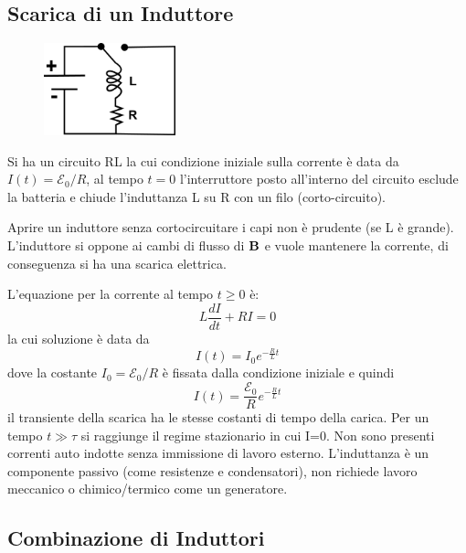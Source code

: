 \subsection{Scarica di un Induttore}

	\begin{figure} %
    \centering
    \includegraphics[width=0.34\textwidth]{images/inductance_discharge} %
\end{figure}
Si ha un circuito RL la cui condizione iniziale sulla corrente \`e data da $I(t) = \mathcal{E}_0/R$, al tempo $t = 0$ l'interruttore posto all'interno del circuito esclude la batteria e chiude l'induttanza L su R con un filo (corto-circuito).

\begin{remark}
Aprire un induttore senza cortocircuitare i capi non \`e prudente (se L \`e grande). L'induttore si oppone ai cambi di flusso di $\bold{B}$ e vuole mantenere la corrente, di conseguenza si ha una scarica elettrica. 	
\end{remark}

L'equazione per la corrente al tempo $t \geq 0$ \`e:
\begin{equation*}
	L \frac{dI}{dt} + RI = 0
\end{equation*}
la cui soluzione \`e data da
\begin{equation*}
	I(t) = I_0 e^{- \frac{R}{L}t}
\end{equation*}
dove la costante $I_0 = \mathcal{E}_0 / R$ \`e fissata dalla condizione iniziale e quindi
\begin{equation}
	I(t) = \frac{\mathcal{E}_0}{R}e^{- \frac{R}{L}t}
\end{equation} 
il transiente della scarica ha le stesse costanti di tempo della carica. Per un tempo $t \gg \tau $ si raggiunge il regime stazionario in cui I=0. Non sono presenti correnti auto indotte senza immissione di lavoro esterno. L'induttanza \`e un componente passivo (come resistenze e condensatori), non richiede lavoro meccanico o chimico/termico come un generatore.

\subsection{Combinazione di Induttori}

